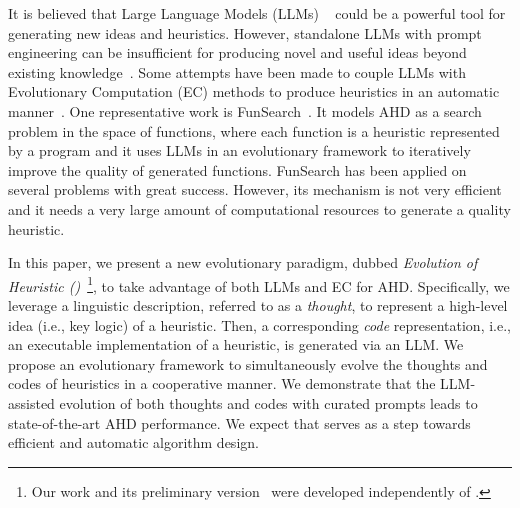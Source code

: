 
It is believed that Large Language Models (LLMs) ~\cite{chen2021evaluating, austin2021program, li2023starcoder} could be a powerful tool for generating new ideas and heuristics. 
%
%
However, standalone LLMs with prompt engineering can be insufficient for producing novel and useful ideas beyond existing knowledge~\cite{mahowald2023dissociating}.
%
Some attempts have been made to couple LLMs with Evolutionary Computation (EC) methods to produce heuristics in an automatic manner~\cite{yang2023large, meyerson2023language, chen2023evoprompting}. 
%
One representative work is FunSearch~\cite{romera2024mathematical}. 
%
It models AHD as a search problem in the space of functions, where each function is a heuristic represented by a program and it uses LLMs in an evolutionary framework to iteratively improve the quality of generated functions. FunSearch has been applied on several problems with great success. However, its mechanism is not very efficient and it needs a very large amount of computational resources to generate a quality heuristic. 


In this paper, we present a new evolutionary paradigm, dubbed \emph{Evolution of Heuristic (\ourmethod{})}~\footnote{Our work and its preliminary version~\cite{liu2023algorithm} were developed independently of \citet{romera2024mathematical}.}, to take advantage of both LLMs and EC for AHD.
%
Specifically, we leverage a linguistic description, referred to as a \emph{thought}, to represent a high-level idea (i.e., key logic) of a heuristic. 
%
Then, a corresponding \emph{code} representation, i.e., an executable implementation of a heuristic, is generated via an LLM.
%
We propose an evolutionary framework to simultaneously evolve the thoughts and codes of heuristics in a cooperative manner.
%
We demonstrate that the LLM-assisted evolution of both thoughts and codes with curated prompts leads to state-of-the-art AHD performance.
%
We expect that \ourmethod{} serves as a step towards efficient and automatic algorithm design. 

